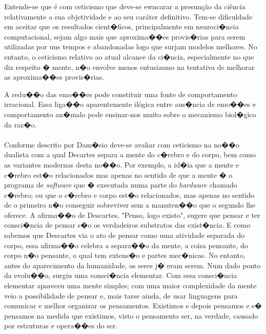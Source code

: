 Entende-se que é com ceticismo que deve-se ewncarar a presunção da ciência relativamente a sua objetividade e ao seu caráter definitivo. Tem-se dificuldade em aceitar que os resultados cient�ficos, principalmente em neuroci�ncia computacional, sejam algo mais que aproxima��es provis�rias para serem utilizadas por uns tempos e abandonadas logo que surjam modelos melhores. No entanto, o ceticismo relativo ao atual alcance da ci�ncia, especialmente no que diz respeito � mente, n�o envolve menos entusiasmo na tentativa de melhorar as aproxima��es provis�rias.


A redu��o das emo��es pode constituir uma fonte de comportamento irracional. Essa liga��o aparentemente ilógica entre aus�ncia de emo��es e comportamento an�malo pode ensinar-nos muito sobre o mecanismo biol�gico da raz�o.


\paragraph{}Conforme descrito por Dam�sio \cite{Damasio96} deve-se avaliar com ceticismo na no��o dualista com a qual Decartes separa a mente do c�rebro e do corpo, bem como as variantes modernas desta no��o. Por exemplo, a id�ia que a mente e c�rebro est�o relacionados mas apenas no sentido de que a mente � o programa de \textit{software} que � executada numa parte do \textit{hardware} chamado c�rebro; ou que o c�rebro e corpo est�o relacionados, mas apenas no sentido de o primeiro n�o conseguir sobreviver sem a manuten��o que o segundo lhe oferece. A afirma��o de Descartes, "Penso, logo existo", sugere que pensar e ter consci�ncia de pensar s�o os verdadeiros substratos das exist�ncia. E como sabemos que Descartes via o ato de pensar como uma atividade separada do corpo, essa afirma��o celebra a separa��o da mente, a coisa pensante, do corpo n�o pensante, o qual tem extens�o e partes mec�nicas.
No entanto, antes do aparecimento da humanidade, os seres j� eram serem. Num dado ponto da evolu��o, surgiu uma consci�ncia elementar. Com essa consci�ncia elementar apareceu uma mente simples; com uma maior complexidade da mente veio a possibilidade de pensar e, mais tarse ainda, de usar linguagens para comunicar e melhor organizar os pensamentos. Existimos e depois pensamos e s� pensamos na medida que existimos, visto o pensamento ser, na verdade, causado por estruturas e opera��es do ser.
